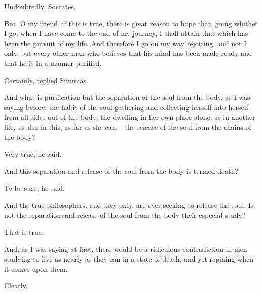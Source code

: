 \documentclass[11pt,letter]{article}
\begin{document}
\par  Undoubtedly, Socrates.

\par  But, O my friend, if this is true, there is great reason to hope that, going whither I go, when I have come to the end of my journey, I shall attain that which has been the pursuit of my life. And therefore I go on my way rejoicing, and not I only, but every other man who believes that his mind has been made ready and that he is in a manner purified.

\par  Certainly, replied Simmias.

\par  And what is purification but the separation of the soul from the body, as I was saying before; the habit of the soul gathering and collecting herself into herself from all sides out of the body; the dwelling in her own place alone, as in another life, so also in this, as far as she can;—the release of the soul from the chains of the body?

\par  Very true, he said.

\par  And this separation and release of the soul from the body is termed death?

\par  To be sure, he said.

\par  And the true philosophers, and they only, are ever seeking to release the soul. Is not the separation and release of the soul from the body their especial study?

\par  That is true.

\par  And, as I was saying at first, there would be a ridiculous contradiction in men studying to live as nearly as they can in a state of death, and yet repining when it comes upon them.

\par  Clearly.
\end{document}
